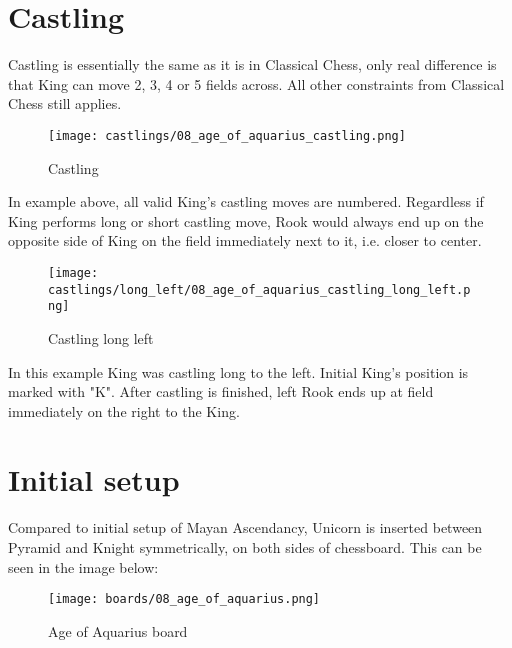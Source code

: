 \clearpage %

\section*{Castling}

Castling is essentially the same as it is in Classical Chess, only real difference is that
King can move 2, 3, 4 or 5 fields across. All other constraints from Classical Chess still
applies.

\noindent
\begin{figure}[!h]
\texttt{[image: castlings/08\_age\_of\_aquarius\_castling.png]}
\caption{Castling}
\label{fig:08_age_of_aquarius_castling}
\end{figure}

In example above, all valid King's castling moves are numbered. Regardless if King performs
long or short castling move, Rook would always end up on the opposite side of King on the
field immediately next to it, i.e. closer to center.

\noindent
\begin{figure}[!h]
\texttt{[image: castlings/long\_left/08\_age\_of\_aquarius\_castling\_long\_left.png]}
\caption{Castling long left}
\label{fig:08_age_of_aquarius_castling_long_left}
\end{figure}

In this example King was castling long to the left. Initial King's position is marked with "K".
After castling is finished, left Rook ends up at field immediately on the right to the King.

\clearpage %

\section*{Initial setup}

Compared to initial setup of Mayan Ascendancy, Unicorn is inserted between Pyramid and Knight
symmetrically, on both sides of chessboard. This can be seen in the image below:

\noindent
\begin{figure}[h]
\texttt{[image: boards/08\_age\_of\_aquarius.png]}
\caption{Age of Aquarius board}
\label{fig:08_age_of_aquarius}
\end{figure}

\clearpage %
